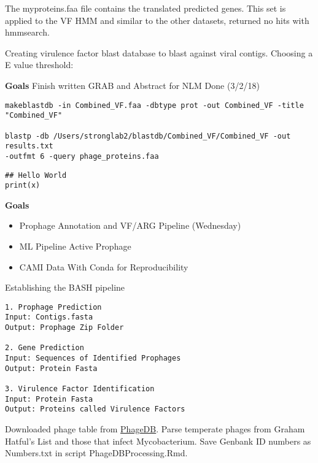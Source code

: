 \documentclass[idxtotoc,hyperref,openany,oneside]{labbook} %
\begin{document}
The myproteins.faa file contains the translated predicted genes. This set is applied to the VF HMM and similar to the other datasets, returned no hits with hmmsearch. 

\vspace{0.3cm}

Creating virulence factor blast database to blast against viral contigs. Choosing a E value threshold:


\textbf{Goals}
Finish written GRAB and Abstract for NLM
Done (3/2/18)


\begin{verbatim}
makeblastdb -in Combined_VF.faa -dbtype prot -out Combined_VF -title "Combined_VF"

blastp -db /Users/stronglab2/blastdb/Combined_VF/Combined_VF -out results.txt
-outfmt 6 -query phage_proteins.faa
\end{verbatim}


\begin{lstlisting}
## Hello World 
print(x)
\end{lstlisting} 






\textbf{Goals}
\begin{itemize}
\item Prophage Annotation and VF/ARG Pipeline (Wednesday)
\item ML Pipeline Active Prophage
\item CAMI Data With Conda for Reproducibility
\end{itemize}

Establishing the BASH pipeline

\begin{verbatim}
1. Prophage Prediction
Input: Contigs.fasta
Output: Prophage Zip Folder

2. Gene Prediction
Input: Sequences of Identified Prophages
Output: Protein Fasta

3. Virulence Factor Identification
Input: Protein Fasta
Output: Proteins called Virulence Factors

\end{verbatim}



Downloaded phage table from \href{http://phagesdb.org/data/}{PhageDB}. Parse temperate phages from Graham Hatful's List and those that infect Mycobacterium. Save Genbank ID numbers as Numbers.txt in script PhageDBProcessing.Rmd.
\end{document}
